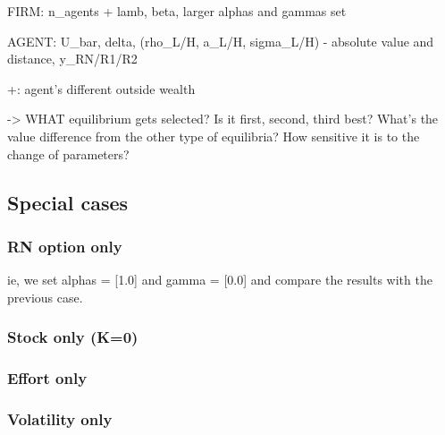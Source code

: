     FIRM: n_agents + lamb, beta, larger alphas and gammas set

    AGENT: U_bar, delta, (rho_L/H, a_L/H, sigma_L/H) - absolute value and distance, y_RN/R1/R2

    +: agent's different outside wealth

    -> WHAT equilibrium gets selected? Is it first, second, third best? What's the value difference from the other type of equilibria? How sensitive it is to the change of parameters?
    






\subsection*{Special cases}
\subsubsection*{RN option only}
ie, we set alphas = [1.0] and gamma = [0.0] and compare the results with the previous case.
\subsubsection*{Stock only (K=0)}

\subsubsection*{Effort only}

\subsubsection*{Volatility only}


